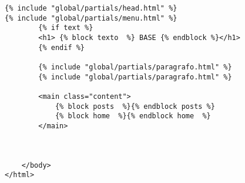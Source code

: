 \documentclass{article}
\begin{document}
\begin{lstlisting}[style=htmlStyle, caption={base/global/base.html}]
    {% include "global/partials/head.html" %}
{% include "global/partials/menu.html" %}
        {% if text %}
        <h1> {% block texto  %} BASE {% endblock %}</h1>
        {% endif %}
        
        {% include "global/partials/paragrafo.html" %}
        {% include "global/partials/paragrafo.html" %}

        <main class="content">
            {% block posts  %}{% endblock posts %}
            {% block home  %}{% endblock home  %}  
        </main>
        
        
        
    </body>
</html>
\end{lstlisting}
\end{document}

